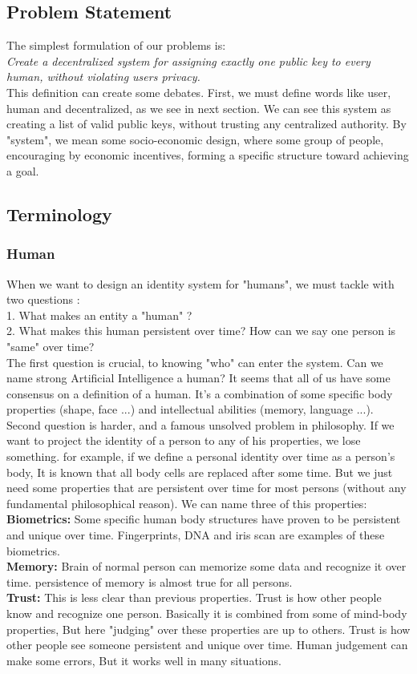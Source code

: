 \documentclass[conference]{IEEEtran}
\begin{document}
\subsection{Problem Statement}
The simplest formulation of our problems is: \\
\textit{Create a decentralized system for assigning exactly one public key to every human, without violating users privacy. }
\\
This definition can create some debates. First, we must define words like user, human and decentralized, as we see in next section. We can see this system as creating a list of valid public keys, without trusting any centralized authority. By "system", we mean some socio-economic design, where some group of people, encouraging by economic incentives, forming a specific structure toward achieving a goal. 

\subsection{Terminology}

\subsubsection{Human}
When we want to design an identity system for "humans", we must tackle with two questions :
\\
1. What makes an entity a "human" ?
\\
2. What makes this human persistent over time? How  can we say one person is "same" over time?
\\
The first question is crucial, to knowing "who" can enter the system. Can we name strong Artificial Intelligence a human? It seems that all of us have some consensus on a definition of a human. It's a combination of some specific body properties (shape, face ...) and intellectual abilities (memory, language ...). 
\\
Second question is harder, and a famous unsolved problem in philosophy. If we want to project the identity of a person to any of his properties, we lose something. for example, if we define a personal identity over time as a person's body, It is known that all body cells are replaced after some time. But we just need some properties that are persistent over time for most persons (without any fundamental philosophical reason). We can name three of this properties: 
\\
\textbf{Biometrics:} Some specific human body structures have proven to be persistent and unique over time. Fingerprints, DNA and iris scan are examples of these biometrics.
\\
\textbf{Memory:} Brain of normal person can memorize some data and recognize it over time. persistence of memory is almost true for all persons.
\\
\textbf{Trust:} This is less clear than previous properties. Trust is how other people know and recognize one person. Basically it is combined from some of mind-body properties, But here "judging" over these properties are up to others. Trust is how other people see someone persistent and unique over time. Human judgement can make some errors, But it works well in many situations.
\end{document}

